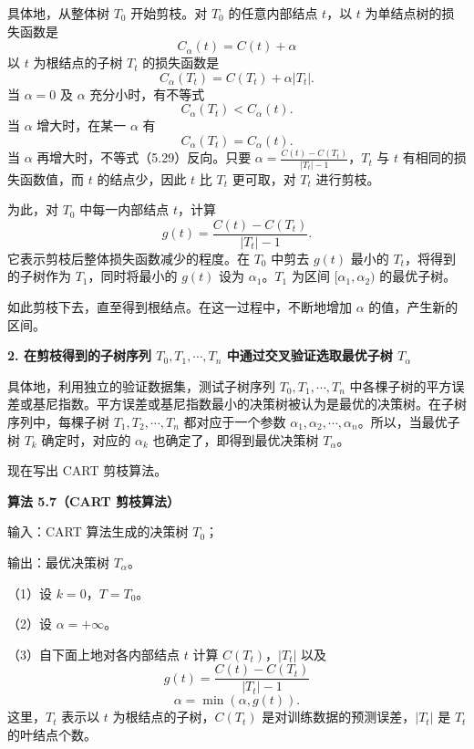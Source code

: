 \documentclass[UTF8, 12pt, fontset=fandol, oneside]{ctexart}
\begin{document}
具体地，从整体树 $T_0$ 开始剪枝。对 $T_0$ 的任意内部结点 $t$，以 $t$ 为单结点树的损失函数是
\begin{equation}
  C_\alpha(t)=C(t)+\alpha
  \tag{5.27}
\end{equation}
以 $t$ 为根结点的子树 $T_t$ 的损失函数是
\begin{equation}
  C_\alpha(T_t)=C(T_t)+\alpha|T_t|.
  \tag{5.28}
\end{equation}
当 $\alpha=0$ 及 $\alpha$ 充分小时，有不等式
\begin{equation}
  C_\alpha(T_t)<C_\alpha(t).
  \tag{5.29}
\end{equation}
当 $\alpha$ 增大时，在某一 $\alpha$ 有
\begin{equation}
  C_\alpha(T_t)=C_\alpha(t).
  \tag{5.30}
\end{equation}
当 $\alpha$ 再增大时，不等式（5.29）反向。只要 $\alpha=\frac{C(t)-C(T_t)}{|T_t|-1}$，$T_t$ 与 $t$ 有相同的损失函数值，而 $t$ 的结点少，因此 $t$ 比 $T_t$ 更可取，对 $T_t$ 进行剪枝。

为此，对 $T_0$ 中每一内部结点 $t$，计算
\begin{equation}
  g(t)=\frac{C(t)-C(T_t)}{|T_t|-1}.
  \tag{5.31}
\end{equation}
它表示剪枝后整体损失函数减少的程度。在 $T_0$ 中剪去 $g(t)$ 最小的 $T_t$，将得到的子树作为 $T_1$，同时将最小的 $g(t)$ 设为 $\alpha_1$。$T_1$ 为区间 $[\alpha_1,\alpha_2)$ 的最优子树。

如此剪枝下去，直至得到根结点。在这一过程中，不断地增加 $\alpha$ 的值，产生新的区间。

\noindent\textbf{2. 在剪枝得到的子树序列 $T_0,T_1,\cdots,T_n$ 中通过交叉验证选取最优子树 $T_\alpha$}

具体地，利用独立的验证数据集，测试子树序列 $T_0,T_1,\cdots,T_n$ 中各棵子树的平方误差或基尼指数。平方误差或基尼指数最小的决策树被认为是最优的决策树。在子树序列中，每棵子树 $T_1,T_2,\cdots,T_n$ 都对应于一个参数 $\alpha_1,\alpha_2,\cdots,\alpha_n$。所以，当最优子树 $T_k$ 确定时，对应的 $\alpha_k$ 也确定了，即得到最优决策树 $T_\alpha$。

现在写出 CART 剪枝算法。

\noindent\textbf{算法 5.7（CART 剪枝算法）}

输入：CART 算法生成的决策树 $T_0$；

输出：最优决策树 $T_\alpha$。

（1）设 $k=0$，$T=T_0$。

（2）设 $\alpha=+\infty$。

（3）自下面上地对各内部结点 $t$ 计算 $C(T_t)$，$|T_t|$ 以及
\[
  g(t)=\frac{C(t)-C(T_t)}{|T_t|-1}
\]
\[
  \alpha=\min(\alpha,g(t)).
\]
这里，$T_t$ 表示以 $t$ 为根结点的子树，$C(T_t)$ 是对训练数据的预测误差，$|T_t|$ 是 $T_t$ 的叶结点个数。
\end{document}
